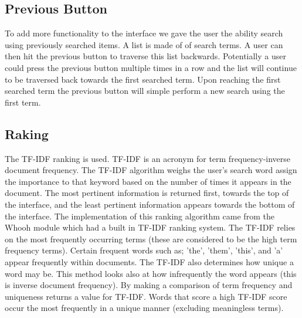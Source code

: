 \documentclass{sig-alternate-05-2015}
\begin{document}
  \subsection{Previous Button  }
  To add more functionality to the interface we gave the user the ability search using previously searched items. A list is made of of search terms. A user can then hit the previous button to traverse this list backwards. Potentially a user could press the previous button multiple times in a row and the list will continue to be traversed back towards the first searched term. Upon reaching the first searched term the previous button will simple perform a new search using the first term.
  
 \subsection{Raking}
 The TF-IDF ranking is used. TF-IDF is an acronym for term frequency-inverse document frequency. The TF-IDF algorithm weighs the user's search word assign the importance to that keyword based on the number of times it appears in the document. The most pertinent information is returned first, towards the top of the interface, and the least pertinent information appears towards the bottom of the interface. The implementation of this ranking algorithm came from the Whooh module which had a built in TF-IDF ranking system. The TF-IDF relies on the most frequently occurring terms (these are considered to be the high term frequency terms). Certain frequent words such as; 'the', 'them', 'this', and 'a'  appear frequently within documents. The TF-IDF also determines how unique a word may be. This method looks also at how infrequently the word appears (this is inverse document frequency). By making a comparison of term frequency and uniqueness returns a value for TF-IDF. Words that score a high TF-IDF score occur the most frequently in a unique manner (excluding meaningless terms).
\\
\end{document}
